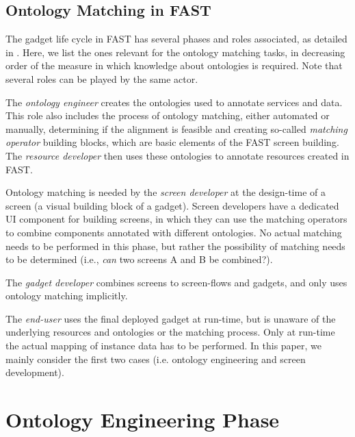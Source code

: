 \subsection{Ontology Matching in FAST}
\label{ominfast}

The gadget life cycle in FAST has several phases and roles associated, as detailed in \cite{hoyer-fast}. Here, we list the ones relevant for the ontology matching tasks, in decreasing order of the measure in which knowledge about ontologies is required. Note that several roles can be played by the same actor.
\begin{inparaenum}[(i)]
    \item The \textit{ontology engineer} creates the ontologies used to annotate services and data. This role also includes the process of ontology matching, either automated or manually, determining if the alignment is feasible and creating so-called \emph{matching operator} building blocks, which are basic elements of the FAST screen building. The \textit{resource developer} then uses these ontologies to annotate resources created in FAST.
    \item Ontology matching is needed by the \textit{screen developer} at the design-time of a screen (a visual building block of a gadget). Screen developers have a dedicated UI component for building screens, in which they can use the matching operators to combine components annotated with different ontologies. No actual matching needs to be performed in this phase, but rather the possibility of matching needs to be determined (i.e., \emph{can} two screens A and B be combined?).
    \item The \emph{gadget developer} combines screens to screen-flows and gadgets, and only uses ontology matching implicitly.
    \item The \textit{end-user} uses the final deployed gadget at run-time, but is unaware of the underlying resources and ontologies or the matching process. Only at run-time the actual mapping of instance data has to be performed. In this paper, we mainly consider the first two cases (i.e. ontology engineering and screen development).
\end{inparaenum}


\section{Ontology Engineering Phase}

